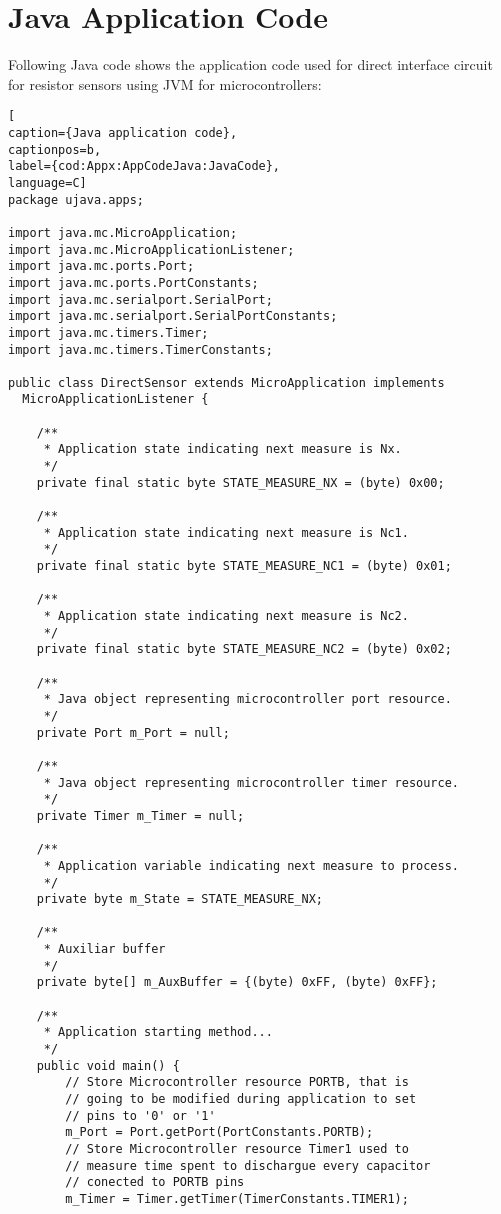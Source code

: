 \chapter{Java Application Code}\label{Appx:AppCodeJava}
Following Java code shows the application code used for direct interface circuit for resistor sensors using JVM for microcontrollers:
\medskip
\begin{lstlisting}[
caption={Java application code},
captionpos=b,
label={cod:Appx:AppCodeJava:JavaCode},
language=C]
package ujava.apps;

import java.mc.MicroApplication;
import java.mc.MicroApplicationListener;
import java.mc.ports.Port;
import java.mc.ports.PortConstants;
import java.mc.serialport.SerialPort;
import java.mc.serialport.SerialPortConstants;
import java.mc.timers.Timer;
import java.mc.timers.TimerConstants;

public class DirectSensor extends MicroApplication implements
  MicroApplicationListener {

    /**
     * Application state indicating next measure is Nx.
     */
    private final static byte STATE_MEASURE_NX = (byte) 0x00;

    /**
     * Application state indicating next measure is Nc1.
     */
    private final static byte STATE_MEASURE_NC1 = (byte) 0x01;

    /**
     * Application state indicating next measure is Nc2.
     */
    private final static byte STATE_MEASURE_NC2 = (byte) 0x02;

    /**
     * Java object representing microcontroller port resource.
     */
    private Port m_Port = null;

    /**
     * Java object representing microcontroller timer resource.
     */
    private Timer m_Timer = null;

    /**
     * Application variable indicating next measure to process.
     */
    private byte m_State = STATE_MEASURE_NX;

    /**
     * Auxiliar buffer
     */
    private byte[] m_AuxBuffer = {(byte) 0xFF, (byte) 0xFF};

    /**
     * Application starting method...
     */
    public void main() {
        // Store Microcontroller resource PORTB, that is
        // going to be modified during application to set
        // pins to '0' or '1'
        m_Port = Port.getPort(PortConstants.PORTB);
        // Store Microcontroller resource Timer1 used to
        // measure time spent to dischargue every capacitor
        // conected to PORTB pins
        m_Timer = Timer.getTimer(TimerConstants.TIMER1);


\end{lstlisting}
